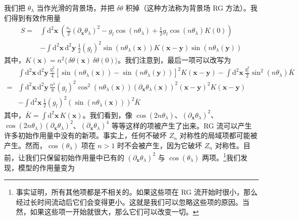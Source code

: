 我们把 $\theta_{\lambda}$ 当作光滑的背景场，并把 $\delta\theta$ 积掉（这种方法称为背景场 RG 方法）。我们得到有效作用量
\begin{equation*}
\begin{aligned}
S = {} & \int \mathrm{d}^{2}\pmb{x}\ \left( \frac{\kappa_{l}}{2}(\partial_{\pmb{x}}\theta_{\lambda})^{2} - g_{l}\cos(n\theta_{\lambda}) + \frac{1}{2}g_{l}\cos(n\theta_{\lambda})K(0) \right) \\
& - \int \mathrm{d}^{2}\pmb{x}\,\mathrm{d}^{2}\pmb{y}\ \frac{1}{2}(g_{l})^{2}\sin(n\theta_{\lambda}(\pmb{x}))K(\pmb{x}-\pmb{y})\sin(n\theta_{\lambda}(\pmb{y}))
\end{aligned}
\end{equation*}
其中，$K(\pmb{x}) = n^2\langle\,\delta\theta(\pmb{x})\,\delta\theta(0)\rangle$。我们注意到，最后一项可以改写为
\begin{align*}
&\int \mathrm{d}^2\pmb{x}\,\mathrm{d}^2\pmb{y}\,\frac{g_l^2}{4}[\sin(n\theta_\lambda(\pmb{x})) - \sin(n\theta_\lambda(\pmb{y}))]^2 K(\pmb{x}-\pmb{y}) - \int \mathrm{d}^2\pmb{x}\,\frac{g_l^2}{2}\sin^2(n\theta_\lambda)\bar{K} \\
={}& \int \mathrm{d}^2\pmb{x}\,\mathrm{d}^2\pmb{y}\,\frac{n^2}{8}(g_l)^2\cos^2(n\theta_\lambda(\pmb{x}))(\partial_{\pmb{x}}\theta_\lambda(\pmb{x}))^2(\pmb{x}-\pmb{y})^2 K(\pmb{x}-\pmb{y}) \\
&- \int \mathrm{d}^2\pmb{x}\,\frac{1}{2}(g_l)^2(\sin(n\theta_\lambda(\pmb{x})))^2\bar{K}
\end{align*}
其中，$\bar{K} = \int \mathrm{d}^2\pmb{x}\,K(\pmb{x})$。我们看到，像 $\cos(2n\theta_\lambda)$、$(\partial_{\pmb{x}}\theta_\lambda)^2$、$\cos(2n\theta_\lambda)(\partial_{\pmb{x}}\theta_\lambda)^2$、$(\partial_{\pmb{x}}\theta_\lambda)^4$ 等等这样的项被产生了出来。RG 流可以产生许多初始作用量中没有的新项。事实上，任何不破坏 $Z_n$ 对称性的局域项都可能被产生。然而，$\cos(\theta_\lambda)$ 项在 $n>1$ 时不会被产生，因为它破坏 $Z_n$ 对称性。目前，让我们只保留初始作用量中已有的 $(\partial_{\pmb{x}}\theta_\lambda)^2$ 与 $\cos(\theta_\lambda)$ 两项。\footnote{事实证明，所有其他项都是不相关的。如果这些项在 RG 流开始时很小，那么经过长时间流动后它们会变得更小。这就是我们可以忽略这些项的原因。当然，如果这些项一开始就很大，那么它们可以改变一切。}我们发现，模型的作用量变为
